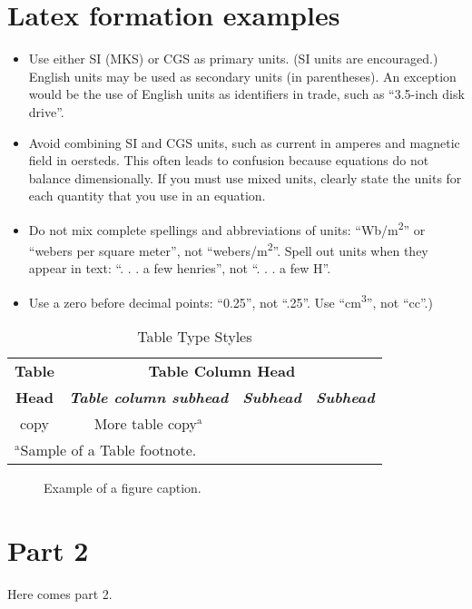 \documentclass[conference]{IEEEtran}
\begin{document}
\section{Latex formation examples}


\cite{softwaremetricsandsoftwaremetrology_2010}

\cite{5609739}
\cite{6269563}
\cite{5609687}


\begin{itemize}
\item Use either SI (MKS) or CGS as primary units. (SI units are encouraged.) English units may be used as secondary units (in parentheses). An exception would be the use of English units as identifiers in trade, such as ``3.5-inch disk drive''.
\item Avoid combining SI and CGS units, such as current in amperes and magnetic field in oersteds. This often leads to confusion because equations do not balance dimensionally. If you must use mixed units, clearly state the units for each quantity that you use in an equation.
\item Do not mix complete spellings and abbreviations of units: ``Wb/m\textsuperscript{2}'' or ``webers per square meter'', not ``webers/m\textsuperscript{2}''. Spell out units when they appear in text: ``. . . a few henries'', not ``. . . a few H''.
\item Use a zero before decimal points: ``0.25'', not ``.25''. Use ``cm\textsuperscript{3}'', not ``cc''.)
\end{itemize}

\begin{table}[htbp]
\caption{Table Type Styles}
\begin{center}
\begin{tabular}{|c|c|c|c|}
\hline
\textbf{Table}&\multicolumn{3}{|c|}{\textbf{Table Column Head}} \\
\cline{2-4} 
\textbf{Head} & \textbf{\textit{Table column subhead}}& \textbf{\textit{Subhead}}& \textbf{\textit{Subhead}} \\
\hline
copy& More table copy$^{\mathrm{a}}$& &  \\
\hline
\multicolumn{4}{l}{$^{\mathrm{a}}$Sample of a Table footnote.}
\end{tabular}
\label{tab1}
\end{center}
\end{table}

\begin{figure}[htbp]
\caption{Example of a figure caption.}
\label{fig}
\end{figure}


\section{Part 2}


Here comes part 2.

\printbibliography
\end{document}
